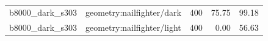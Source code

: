 \begin{longtable}{l>{\raggedright\arraybackslash}p{.42\linewidth}rrr}
b8000\_\allowbreak{}dark\_\allowbreak{}s303 & %
geometry:nailfighter/dark & %
400 & %
75.75 & %
99.18 \\ %

b8000\_\allowbreak{}dark\_\allowbreak{}s303 & %
geometry:nailfighter/light & %
400 & %
0.00 & %
56.63 \\ %


\end{longtable}
